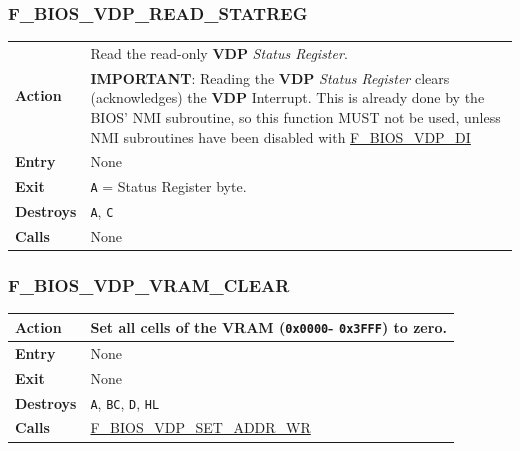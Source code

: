 \documentclass[a4paper,11pt]{article}
\begin{document}
        \subsubsection{F\_BIOS\_VDP\_READ\_STATREG}
        \label{func:fbiosvdpreadstatreg}
        \begin{tabular}{l p{9cm}}
            \hline\multirow[t]{2}{4em}{\textbf{Action}}& Read the read-only
            \textbf{VDP} \textit{Status Register}.\\
            & \textbf{IMPORTANT}: Reading the \textbf{VDP} \textit{Status
            Register} clears (acknowledges) the \textbf{VDP} Interrupt. This is
            already done by the BIOS' NMI subroutine, so this function MUST not
            be used, unless NMI subroutines have been disabled with
            \hyperref[func:fbiosvdpdi]{F\_BIOS\_VDP\_DI}\\
            \hline\textbf{Entry} & None\\
            \hline\textbf{Exit} & \texttt{A} = Status Register byte.\\
            \hline\textbf{Destroys} & \texttt{A}, \texttt{C}\\
            \hline\textbf{Calls} & None\\
            \hline
        \end{tabular}

        \subsubsection{F\_BIOS\_VDP\_VRAM\_CLEAR}
        \label{func:fbiosvdpvramclear}
        \begin{tabular}{l p{9cm}}
            \hline\textbf{Action}
            & Set all cells of the \textbf{VRAM} (\texttt{0x0000}-
            \texttt{0x3FFF}) to zero. \\
            \hline\textbf{Entry} & None\\
            \hline\textbf{Exit} & None\\
            \hline\textbf{Destroys} & \texttt{A}, \texttt{BC}, \texttt{D},
            \texttt{HL} \\
            \hline\textbf{Calls} & \hyperref[func:fbiosvdpsetaddrwr]
            {F\_BIOS\_VDP\_SET\_ADDR\_WR}\\
            \hline
        \end{tabular}
\end{document}
